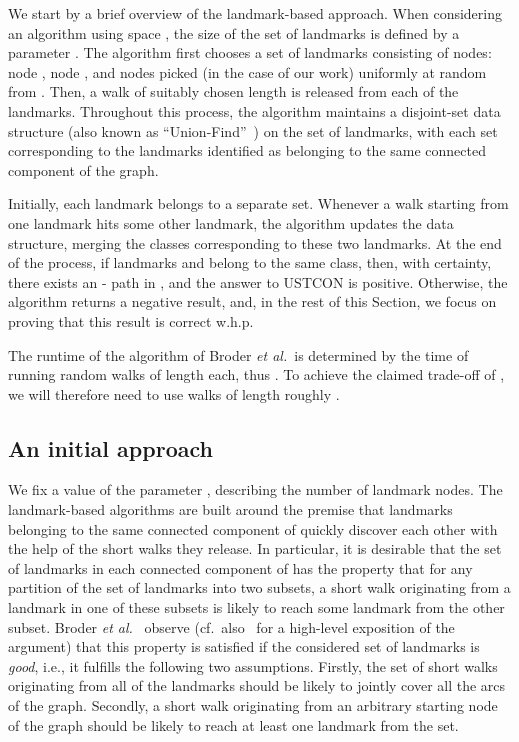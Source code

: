 \documentclass[11pt,a4paper]{article}
\newcommand{\Broder}{Broder \etal}
\newcommand{\etal}{\textsl{et al.}\xspace}
\renewcommand{\*}{\hspace*{5mm}}
\begin{document}
We start by a brief overview of the landmark-based approach. When considering an algorithm using space , the size of the set of landmarks is defined by a parameter . The algorithm first chooses a set of landmarks  consisting of  nodes: node , node , and  nodes picked (in the case of our work) uniformly at random from . Then, a walk of suitably chosen length  is released from each of the landmarks. Throughout this process, the algorithm maintains a disjoint-set data structure (also known as ``Union-Find''~\cite{HU}) on the set of landmarks, with each set corresponding to the landmarks identified as belonging to the same connected component of the graph.

Initially, each landmark belongs to a separate set. Whenever a walk starting from one landmark hits some other landmark, the algorithm updates the data structure, merging the classes corresponding to these two landmarks. At the end of the process, if landmarks  and  belong to the same class, then, with certainty, there exists an - path in , and the answer to USTCON is positive. Otherwise, the algorithm returns a negative result, and, in the rest of this Section, we focus on proving that this result is correct w.h.p.

The runtime of the algorithm of \Broder~is determined by the time of running  random walks of length  each, thus . To achieve the claimed trade-off of , we will therefore need to use walks of length roughly .

\subsection{An initial approach}\label{sec31}

We fix a value of the parameter , describing the number of landmark nodes. The landmark-based algorithms are built around the premise that landmarks belonging to the same connected component of  quickly discover each other with the help of the short walks they release. In particular, it is desirable that the set of landmarks in each connected component of  has the property that for any partition of the set of landmarks into two subsets, a short walk originating from a landmark in one of these subsets is likely to reach some landmark from the other subset. \Broder~\cite{BKRU} observe (cf.\ also~\cite{F} for a high-level exposition of the argument) that this property is satisfied if the considered set of landmarks is \emph{good}, i.e., it fulfills the following two assumptions. Firstly, the set of short walks originating from all of the landmarks should be likely to jointly cover all the arcs of the graph. Secondly, a short walk originating from an arbitrary starting node of the graph should be likely to reach at least one landmark from the set.
\end{document}
